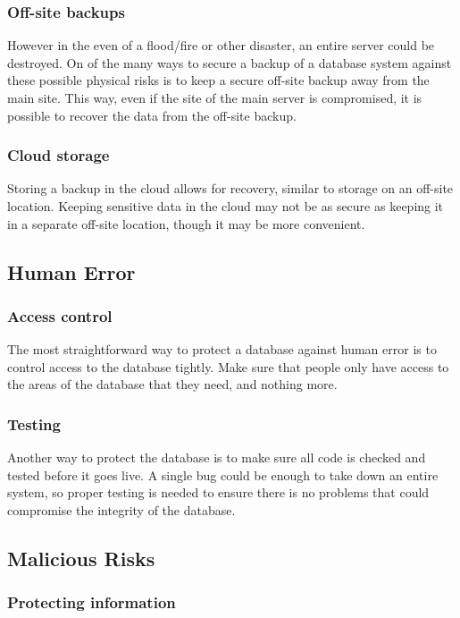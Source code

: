 \documentclass[11pt, twocolumn]{article}
\begin{document}
\subsubsection{Off-site backups}

However in the even of a flood/fire or other disaster, an entire server could be destroyed. On of the many ways to secure a backup of a database system against these possible physical risks is to keep a secure off-site backup away from the main site. This way, even if the site of the main server is compromised, it is possible to recover the data from the off-site backup.

\subsubsection{Cloud storage}

Storing a backup in the cloud allows for recovery, similar to storage on an off-site location. Keeping sensitive data in the cloud may not be as secure as keeping it in a separate off-site location\cite{cloud}, though it may be more convenient.

\subsection{Human Error}
\subsubsection{Access control}
The most straightforward way to protect a database against human error is to control access to the database tightly. Make sure that people only have access to the areas of the database that they need, and nothing more. 

\subsubsection{Testing}

Another way to protect the database is to make sure all code is checked and tested before it goes live. A single bug could be enough to take down an entire system, so proper testing is needed to ensure there is no problems that could compromise the integrity of the database.

\subsection{Malicious Risks}
\subsubsection{Protecting information}
\end{document}
